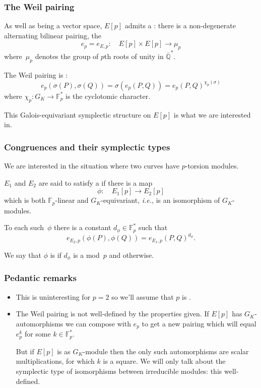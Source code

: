 \documentclass[handout]{beamer}
\newcommand{\Q}{\mathbb Q}
\newcommand{\Qbar}{\overline{\Q}}
\newcommand{\F}{\mathbb F}
\newcommand{\high}[1]{\emph{\color{blue}{#1}}}
\begin{document}
\begin{frame}\frametitle{The Weil pairing}
  As well as being a vector space, $E[p]$ admits a \high{symplectic
    structure}: there is a non-degenerate alternating bilinear
  pairing, the \high{Weil pairing}
  \[
  e_p = e_{E,p}:\quad E[p]\times E[p] \to \mu_p
  \]
  where~$\mu_p$ denotes the group of $p$th roots of unity in
  $\Qbar^*$.
  \pause\medskip

  The Weil pairing is \high{Galois equivariant}:
  \[
  e_p(\sigma(P),\sigma(Q)) = \sigma(e_p(P,Q)) = e_p(P,Q)^{\chi_p(\sigma)}
  \]
  where $\chi_p:G_K\to\F_p^*$ is the cyclotomic character.

  \pause\medskip This Galois-equivariant symplectic structure on $E[p]$ is
  what we are interested in.
\end{frame}

\begin{frame}\frametitle{Congruences and their symplectic types}
  We are interested in the situation where two \high{different} curves have
  \high{isomorphic} $p$-torsion modules.
  \pause\medskip

  $E_1$ and $E_2$ are said to satisfy a \high{mod~$p$ congruence} if
  there is a map
  \[
  \phi:\quad E_1[p] \to E_2[p]
  \]
  which is both $\F_p$-linear and $G_K$-equivariant, \textit{i.e.}, is
  an isomorphism of $G_K$-modules.
  \pause\medskip

  To each such~$\phi$ there is a constant $d_{\phi}\in\F_p^*$ such
  that
  \[
  e_{E_2,p}(\phi(P),\phi(Q)) = e_{E_1,p}(P,Q)^{d_{\phi}}.
  \]

  We say that $\phi$ is \high{symplectic} if $d_{\phi}$ is a
  \high{square} mod~$p$ and \high{antisymplectic} otherwise.
\end{frame}

\begin{frame}\frametitle{Pedantic remarks}
  \begin{itemize}
    \item This is uninteresting for $p=2$ so we'll assume that $p$ is
      \high{odd}.

    \item The Weil pairing is not well-defined by the properties
      given.  If $E[p]$ has $G_K$-automorphisms we can compose with
      $e_p$ to get a new pairing which will equal $e_p^k$ for some
      $k\in\F_p^*$.

      But if $E[p]$ is \high{irreducible} as
      $G_K$-module then the only such automorphisms are scalar
      multiplications, for which $k$ is a square.  We will only talk
      about the symplectic type of isomorphisms between irreducible
      modules: this \high{is} well-defined.
  \end{itemize}
\end{frame}
\end{document}
